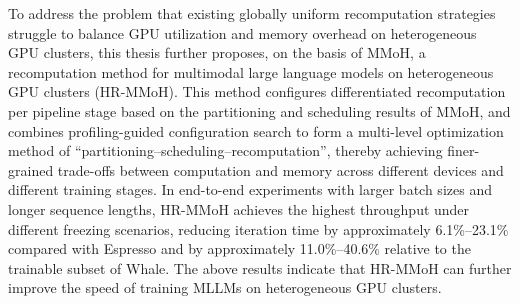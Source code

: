 \begin{eabstract}
To address the problem that existing globally uniform recomputation strategies struggle to balance GPU utilization and memory overhead on heterogeneous GPU clusters, this thesis further proposes, on the basis of MMoH, a recomputation method for multimodal large language models on heterogeneous GPU clusters (HR-MMoH).
This method configures differentiated recomputation per pipeline stage based on the partitioning and scheduling results of MMoH, and combines profiling-guided configuration search to form a multi-level optimization method of ``partitioning--scheduling--recomputation'', thereby achieving finer-grained trade-offs between computation and memory across different devices and different training stages.
In end-to-end experiments with larger batch sizes and longer sequence lengths, HR-MMoH achieves the highest throughput under different freezing scenarios, reducing iteration time by approximately 6.1\%--23.1\% compared with Espresso and by approximately 11.0\%--40.6\% relative to the trainable subset of Whale.
The above results indicate that HR-MMoH can further improve the speed of training MLLMs on heterogeneous GPU clusters.
\end{eabstract}
